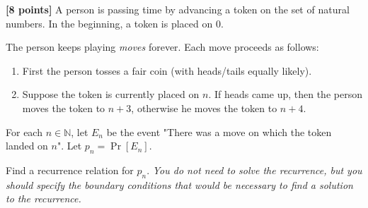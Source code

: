 \documentclass[12pt,oneside]{article}
\begin{document}
\begin{problem}
\end{problem}

\instatements{\newpage}

\begin{problem}
{\bf [8 points]}
A person is passing time by advancing a token on the set of natural numbers. In the beginning, a token is placed on $0$.

The person keeps playing {\em moves} forever. Each move proceeds as follows:
\begin{enumerate}
\item First the person tosses a fair coin (with heads/tails equally likely).
\item Suppose the token is currently placed on $n$. If heads came up, then the person moves the token to $n+3$, otherwise he moves the token to $n+4$.
\end{enumerate}



For each $n \in \mathbb N$, let $E_n$ be the event "There was a move on which the token landed on $n$". Let $p_n = \Pr[E_n]$.

Find a recurrence relation for $p_n$. {\em You do not need to solve the recurrence, but you should specify the boundary conditions that would be necessary to find a solution to the recurrence.}


\end{problem}

\instatements{\newpage}
\end{document}
